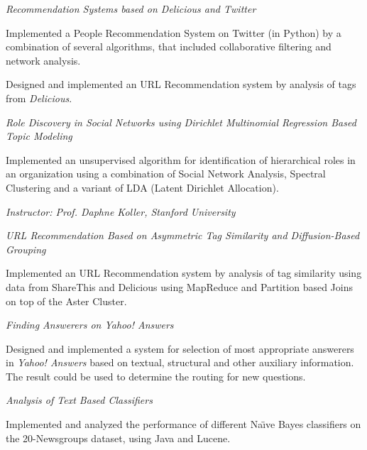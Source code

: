 \documentclass[10pt]{article}
\newcommand{\spc}{\vspace{1mm}}
\begin{document}
\textit{Recommendation Systems based on Delicious and Twitter} 
\begin{compactitem}
\item {Implemented a People Recommendation System on Twitter (in Python) by a combination of several algorithms, that included collaborative filtering and network analysis.}
\item{Designed and implemented an URL Recommendation system by analysis of tags from \emph{Delicious}.}
\end{compactitem}
\spc
\textit{Role Discovery in Social Networks using Dirichlet Multinomial Regression Based Topic Modeling} 
\begin{compactitem}
\item{Implemented an unsupervised algorithm for identification of hierarchical roles in an organization using a combination of Social Network Analysis, Spectral Clustering and a variant of LDA (Latent Dirichlet Allocation).}
\item \emph{Instructor: Prof. Daphne Koller, Stanford University}
\end{compactitem}
\spc
\textit{URL Recommendation Based on Asymmetric Tag Similarity and Diffusion-Based Grouping}
\begin{compactitem}
\item {Implemented an URL Recommendation system by analysis of tag similarity using data from ShareThis and Delicious using MapReduce and Partition based Joins on top of the Aster Cluster.}
\end{compactitem}
\spc

\textit{Finding Answerers on Yahoo! Answers}
\begin{compactitem}
\item {Designed and implemented a system for selection of most appropriate answerers in \emph{Yahoo! Answers} based on textual, structural and other auxiliary information. The result could be used to determine the routing for new questions.}
\end{compactitem}
\spc

\textit{Analysis of Text Based Classifiers}
\begin{compactitem}
\item {Implemented and analyzed the performance of different Na\"{\i}ve Bayes classifiers on the 20-Newsgroups dataset, using Java and Lucene.}
\end{compactitem}
\spc
\end{document}
